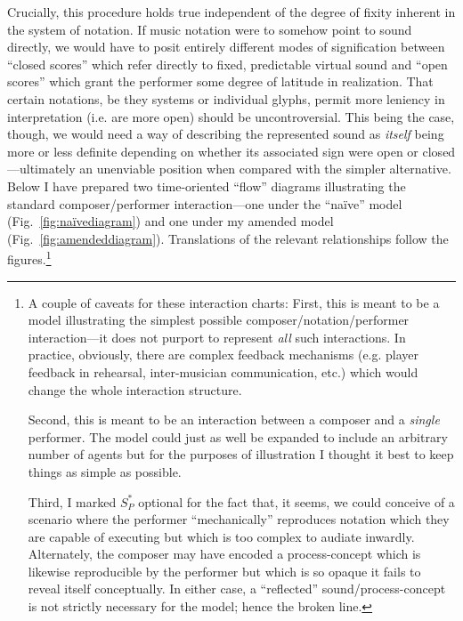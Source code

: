     Crucially, this procedure holds true independent of the degree of fixity inherent in the system of notation. If music notation were to somehow point to sound directly, we would have to posit entirely different modes of signification between ``closed scores'' which refer directly to fixed, predictable virtual sound and ``open scores'' which grant the performer some degree of latitude in realization. That certain notations, be they systems or individual glyphs, permit more leniency in interpretation (i.e. are more open) should be uncontroversial. This being the case, though, we would need a way of describing the represented sound as \textit{itself} being more or less definite depending on whether its associated sign were open or closed---ultimately an unenviable position when compared with the simpler alternative. Below I have prepared two time-oriented ``flow'' diagrams illustrating the standard composer/performer interaction---one under the ``naïve'' model (Fig.~\ref{fig:naïvediagram}) and one under my amended model (Fig.~\ref{fig:amendeddiagram}). Translations of the relevant relationships follow the figures.\footnote{
        A couple of caveats for these interaction charts: First, this is meant to be a model illustrating the simplest possible composer/notation/performer interaction---it does not purport to represent \textit{all} such interactions. In practice, obviously, there are complex feedback mechanisms (e.g. player feedback in rehearsal, inter-musician communication, etc.) which would change the whole interaction structure. 
        
        Second, this is meant to be an interaction between a composer and a \textit{single} performer. The model could just as well be expanded to include an arbitrary number of agents but for the purposes of illustration I thought it best to keep things as simple as possible. 
        
        Third, I marked $S^*_P$ optional for the fact that, it seems, we could conceive of a scenario where the performer ``mechanically'' reproduces notation which they are capable of executing but which is too complex to audiate inwardly. Alternately, the composer may have encoded a process-concept which is likewise reproducible by the performer but which is so opaque it fails to reveal itself conceptually. In either case, a ``reflected'' sound/process-concept is not strictly necessary for the model; hence the broken line.
        
        } 


